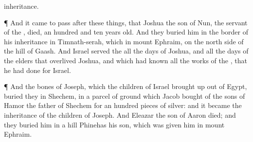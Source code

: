 {inheritance.
\par }{\PP {}¶ And it came to pass
after these
things, that
Joshua the
son of
Nun, the
servant of the
{},
died,
{} an
hundred and
ten
years
old.
And they
buried him in the
border of his
inheritance in
Timnath-serah, which
{} in
mount
Ephraim, on the north
side of the
hill of
Gaash.
And
Israel
served the
{} all the
days of
Joshua, and all the
days of the
elders that
overlived
Joshua, and which had
known all the
works of the
{}, that he had
done for
Israel.
\par }{\PP {}¶ And the
bones of
Joseph, which the
children of
Israel brought
up out of
Egypt,
buried they in
Shechem, in a
parcel of
ground which
Jacob
bought of the
sons of
Hamor the
father of
Shechem for an
hundred pieces of
silver: and it became the
inheritance of the
children of
Joseph.
And
Eleazar the
son of
Aaron
died; and they
buried him in a
hill
{}
Phinehas his
son, which was
given him in
mount
Ephraim.
\par }
